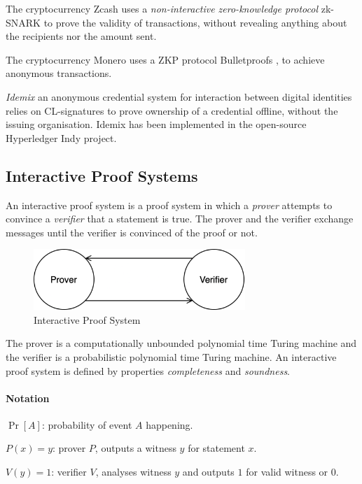 The cryptocurrency Zcash uses a \textit{non-interactive zero-knowledge protocol} zk-SNARK \cite{bowe2018multi} to prove the validity of transactions, without revealing anything about the recipients nor the amount sent.

The cryptocurrency Monero uses a ZKP protocol Bulletproofs \cite{bunz2018bulletproofs}, to achieve anonymous transactions.

\textit{Idemix} \cite{camenisch2002design} an anonymous credential system for interaction between digital identities relies on CL-signatures \cite{camenisch2001efficient} to prove ownership of a credential offline, without the issuing organisation.
Idemix has been implemented in the open-source Hyperledger Indy project.

\newpage
\subsection{Interactive Proof Systems}
\label{section:interactive-proof-systems}
An interactive proof system is a proof system in which a \textit{prover} attempts to convince a \textit{verifier} that a statement is true.
The prover and the verifier exchange messages until the verifier is convinced of the proof or not.

\begin{figure}[h]
	\centering
	\includegraphics[width=8cm]{images/interactive-proof-system}
	\caption{Interactive Proof System}
	\label{fig:interactive-proof-system}
\end{figure}

The prover is a computationally unbounded polynomial time Turing machine and the verifier is a probabilistic polynomial time Turing machine.
An interactive proof system is defined by properties \textit{completeness} and \textit{soundness}.

\paragraph{Notation}
\begin{description}
	\item $\Pr[A]$: probability of event $A$ happening.
	\item $P(x) = y$: prover $P$, outputs a witness $y$ for statement $x$.
	\item $V(y) = 1$: verifier $V$, analyses witness $y$ and outputs $1$ for valid witness or $0$.
\end{description}

